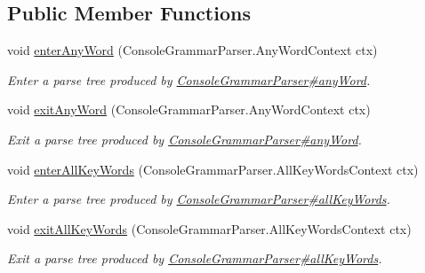 \subsection*{Public Member Functions}
\begin{DoxyCompactItemize}
\item 
void \hyperlink{interfacegov_1_1nasa_1_1jpf_1_1inspector_1_1client_1_1parser_1_1_console_grammar_listener_a33fd4407f6033fe04eb4c4999ca98493}{enter\+Any\+Word} (Console\+Grammar\+Parser.\+Any\+Word\+Context ctx)
\begin{DoxyCompactList}\small\item\em Enter a parse tree produced by \hyperlink{classgov_1_1nasa_1_1jpf_1_1inspector_1_1client_1_1parser_1_1_console_grammar_parser_a33a50c0e5499145e26945de763b14c70}{Console\+Grammar\+Parser\#any\+Word}. \end{DoxyCompactList}\item 
void \hyperlink{interfacegov_1_1nasa_1_1jpf_1_1inspector_1_1client_1_1parser_1_1_console_grammar_listener_a03a3165175c40ad164385eed7148c2fa}{exit\+Any\+Word} (Console\+Grammar\+Parser.\+Any\+Word\+Context ctx)
\begin{DoxyCompactList}\small\item\em Exit a parse tree produced by \hyperlink{classgov_1_1nasa_1_1jpf_1_1inspector_1_1client_1_1parser_1_1_console_grammar_parser_a33a50c0e5499145e26945de763b14c70}{Console\+Grammar\+Parser\#any\+Word}. \end{DoxyCompactList}\item 
void \hyperlink{interfacegov_1_1nasa_1_1jpf_1_1inspector_1_1client_1_1parser_1_1_console_grammar_listener_a19a9ef37abf946b35d51534ab60a663b}{enter\+All\+Key\+Words} (Console\+Grammar\+Parser.\+All\+Key\+Words\+Context ctx)
\begin{DoxyCompactList}\small\item\em Enter a parse tree produced by \hyperlink{classgov_1_1nasa_1_1jpf_1_1inspector_1_1client_1_1parser_1_1_console_grammar_parser_ae08871adf83e51273a2c368571fabd6a}{Console\+Grammar\+Parser\#all\+Key\+Words}. \end{DoxyCompactList}\item 
void \hyperlink{interfacegov_1_1nasa_1_1jpf_1_1inspector_1_1client_1_1parser_1_1_console_grammar_listener_ad617d2616c60fcce7a7257b86870030c}{exit\+All\+Key\+Words} (Console\+Grammar\+Parser.\+All\+Key\+Words\+Context ctx)
\begin{DoxyCompactList}\small\item\em Exit a parse tree produced by \hyperlink{classgov_1_1nasa_1_1jpf_1_1inspector_1_1client_1_1parser_1_1_console_grammar_parser_ae08871adf83e51273a2c368571fabd6a}{Console\+Grammar\+Parser\#all\+Key\+Words}. \end{DoxyCompactList}\item 

\end{DoxyCompactItemize}
